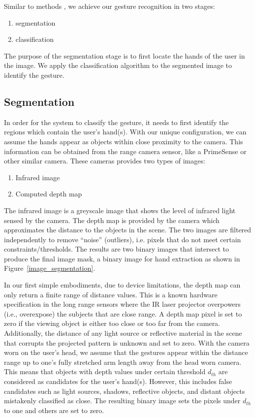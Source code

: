 Similar to methods \cite{li2009real, kjeldsen1996toward, ren2011robust, uebersax2011real},
we achieve our gesture recognition in two stages:
\begin{enumerate}
\item segmentation
\item classification
\end{enumerate}

The purpose of the segmentation stage is to first locate the hands of the user in the image. We apply the classification algorithm to the segmented image to identify the gesture.

\subsection{Segmentation}
In order for the system to classify the gesture, it needs to first identify the regions which contain the user's hand(s). With our unique configuration,
we can assume the hands appear as objects within close proximity to the camera.
This information can be obtained from the range camera sensor,
like a PrimeSense or other similar camera. These cameras provides two
types of images:
\begin{enumerate}
\item Infrared image
\item Computed depth map
\end{enumerate}
The infrared image is a greyscale image that shows the level of infrared
light sensed by the camera. The depth map is provided by the camera which
approximates the distance to the objects in the scene. The two images are
filtered independently to remove ``noise'' (outliers),
i.e. pixels that do not meet certain
constraints/thresholds. The results are two binary images that intersect
to produce the final image mask, a binary image for hand extraction as
shown in Figure~\ref{image_segmentation}.

In our first simple embodiments, due to device limitations, the depth map
can only return a finite range of distance values. This is a known hardware
specification in the long range sensors where the IR laser projector
overpowers (i.e., overexpose) the subjects that are close range. A depth map
pixel is set to zero if the viewing object is either too close or too far from
the camera. Additionally, the distance of any light source or reflective
material in the scene that corrupts the projected pattern is unknown and set
to zero. With the camera worn on the user's head, we assume that the gestures
appear within the distance range up to one's fully stretched arm length away
from the head worn camera. This means that objects with depth values under
certain threshold $d_{th}$ are considered as candidates for the user's hand(s).
However, this includes false candidates such as light sources, shadows,
reflective objects, and distant objects mistakenly classified as close.
The resulting binary image sets the pixels under $d_{th}$ to one and others
are set to zero.

